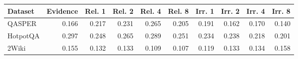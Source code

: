 \begin{tabular}{lrrrrrrrrr}
\toprule
Dataset & Evidence & Rel. 1 & Rel. 2 & Rel. 4 & Rel. 8 & Irr. 1 & Irr. 2 & Irr. 4 & Irr. 8 \\
\midrule
QASPER & 0.166 & 0.217 & 0.231 & 0.265 & 0.205 & 0.191 & 0.162 & 0.170 & 0.140 \\
HotpotQA & 0.297 & 0.248 & 0.265 & 0.289 & 0.251 & 0.234 & 0.238 & 0.218 & 0.201 \\
2Wiki & 0.155 & 0.132 & 0.133 & 0.109 & 0.107 & 0.119 & 0.133 & 0.134 & 0.158 \\
\bottomrule
\end{tabular}
